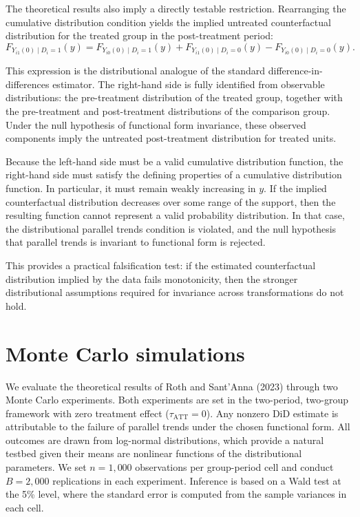 \documentclass[12pt]{article}
\theoremstyle{remark}
\begin{document}
The theoretical results also imply a directly testable restriction. Rearranging the cumulative distribution condition yields the implied untreated counterfactual distribution for the treated group in the post-treatment period:
\[
F_{Y_{i1}(0)\mid D_i=1}(y)
=
F_{Y_{i0}(0)\mid D_i=1}(y)
+
F_{Y_{i1}(0)\mid D_i=0}(y)
-
F_{Y_{i0}(0)\mid D_i=0}(y).
\]

This expression is the distributional analogue of the standard difference-in-differences estimator. The right-hand side is fully identified from observable distributions: the pre-treatment distribution of the treated group, together with the pre-treatment and post-treatment distributions of the comparison group. Under the null hypothesis of functional form invariance, these observed components imply the untreated post-treatment distribution for treated units.

Because the left-hand side must be a valid cumulative distribution function, the right-hand side must satisfy the defining properties of a cumulative distribution function. In particular, it must remain weakly increasing in \(y\). If the implied counterfactual distribution decreases over some range of the support, then the resulting function cannot represent a valid probability distribution. In that case, the distributional parallel trends condition is violated, and the null hypothesis that parallel trends is invariant to functional form is rejected.

This provides a practical falsification test: if the estimated counterfactual distribution implied by the data fails monotonicity, then the stronger distributional assumptions required for invariance across transformations do not hold.

\section{Monte Carlo simulations}

We evaluate the theoretical results of Roth and Sant'Anna (2023) through two Monte Carlo experiments. Both experiments are set in the two-period, two-group framework with zero treatment effect ($\tau_{\text{ATT}} = 0$). Any nonzero DiD estimate is attributable to the failure of parallel trends under the chosen functional form. All outcomes are drawn from log-normal distributions, which provide a natural testbed given their means are nonlinear functions of the distributional parameters. We set $n = 1{,}000$ observations per group-period cell and conduct $B = 2{,}000$ replications in each experiment. Inference is based on a Wald test at the 5\% level, where the standard error is computed from the sample variances in each cell.
\end{document}
